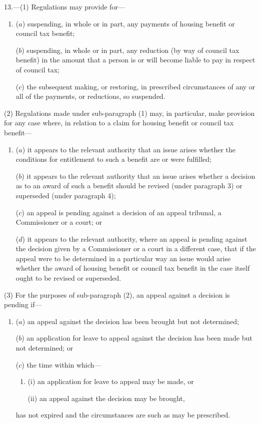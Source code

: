 \documentclass[12pt,a4paper]{article}
\begin{document}
13.---(1) Regulations may provide for—
\begin{enumerate}\item[]
($a$) suspending, in whole or in part, any payments of housing benefit or council tax benefit;

($b$) suspending, in whole or in part, any reduction (by way of council tax benefit) in the amount that a person is or will become liable to pay in respect of council tax;

($c$) the subsequent making, or restoring, in prescribed circumstances of any or all of the payments, or reductions, so suspended.
\end{enumerate}

(2) Regulations made under sub-paragraph (1)  may, in particular, make provision for any case where, in relation to a claim for housing benefit or council tax benefit—
\begin{enumerate}\item[]
($a$) it appears to the relevant authority that an issue arises whether the conditions for entitlement to such a benefit are or were fulfilled;

($b$) it appears to the relevant authority that an issue arises whether a decision as to an award of such a benefit should be revised (under paragraph 3) or superseded (under paragraph 4);

($c$) an appeal is pending against a decision of an appeal tribunal, a Commissioner or a court; or

($d$) it appears to the relevant authority, where an appeal is pending against the decision given by a Commissioner or a court in a different case, that if the appeal were to be determined in a particular way an issue would arise whether the award of housing benefit or council tax benefit in the case itself ought to be revised or superseded.
\end{enumerate}

(3) For the purposes of sub-paragraph (2), an appeal against a decision is pending if—
\begin{enumerate}\item[]
($a$) an appeal against the decision has been brought but not determined;

($b$) an application for leave to appeal against the decision has been made but not determined; or

($c$) the time within which—
\begin{enumerate}\item[]
(i) an application for leave to appeal may be made, or

(ii) an appeal against the decision may be brought,
\end{enumerate}
has not expired and the circumstances are such as may be prescribed.
\end{enumerate}
\end{document}
